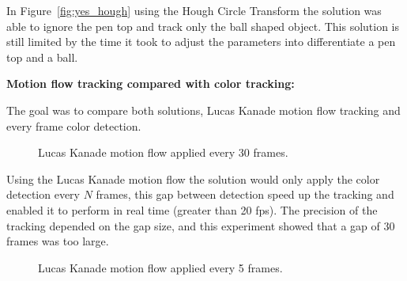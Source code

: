 \documentclass[10pt,twocolumn,letterpaper]{article}
\begin{document}
  In Figure~\ref{fig:yes_hough} using the Hough Circle Transform the solution
  was able to ignore the pen top and track only the ball shaped object. This
  solution is still limited by the time it took to adjust the parameters into
  differentiate a pen top and a ball.

  \bigbreak{}
  \textbf{Motion flow tracking compared with color tracking:}
  \bigbreak{}

  The goal was to compare both solutions, Lucas Kanade motion flow tracking and
  every frame color detection.

  \begin{figure}[!h]
    \centering
    \setlength{\fboxsep}{1pt}
    \setlength{\fboxrule}{1pt}
    \caption{Lucas Kanade motion flow applied every 30 frames.}\label{fig:motion_30}
  \end{figure}

  Using the Lucas Kanade motion flow the solution would only apply the color
  detection every $N$ frames, this gap between detection speed up the tracking
  and enabled it to perform in real time (greater than 20 fps). The precision of
  the tracking depended on the gap size, and this experiment showed that a gap
  of 30 frames was too large.

  \begin{figure}[!h]
    \centering
    \setlength{\fboxsep}{1pt}
    \setlength{\fboxrule}{1pt}
    \caption{Lucas Kanade motion flow applied every 5 frames.}\label{fig:motion_5}
  \end{figure}
\end{document}

